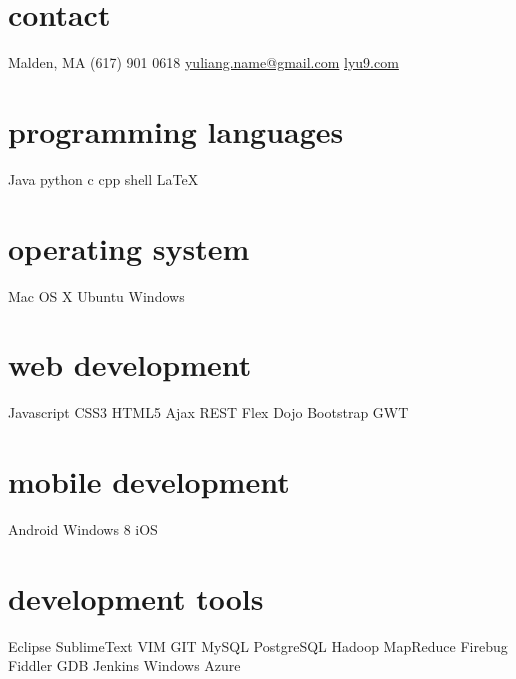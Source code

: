 \documentclass[]{ly-cv} %
\begin{document}
\begin{aside} %
\section{contact}
Malden, MA
(617) 901 0618
\href{mailto:yuliang.name@gmail.com}{yuliang.name@gmail.com}
\href{http://lyu9.com}{lyu9.com}
\section{programming languages}
Java python c cpp 
shell \LaTeX
\section{operating system}
Mac OS X Ubuntu Windows
\section{web development}
Javascript CSS3 HTML5 
Ajax REST Flex Dojo 
Bootstrap GWT
\section{mobile development}
Android Windows 8 iOS
\section{development tools}
Eclipse SublimeText VIM
GIT MySQL PostgreSQL
Hadoop MapReduce 
Firebug Fiddler GDB
Jenkins Windows Azure
\end{aside}
\end{document}
